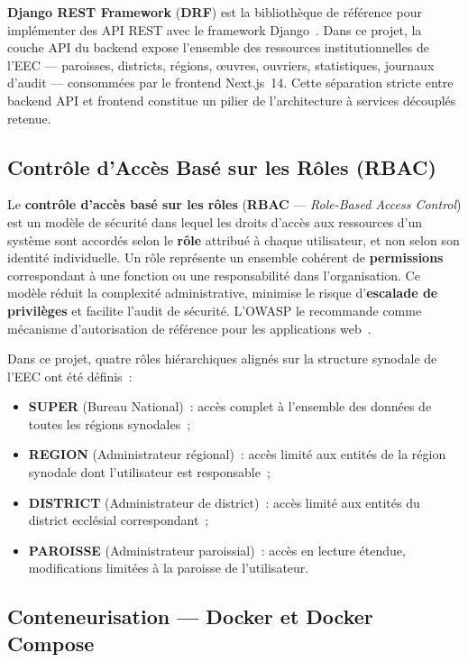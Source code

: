 \documentclass[12pt, a4paper]{report}
\newcommand{\kw}[1]{\textbf{#1}}
\begin{document}
\kw{Django REST Framework} (\kw{DRF}) est la bibliothèque de référence pour
implémenter des API REST avec le framework Django~\cite{drf2024}. Dans ce projet, la couche
API du backend expose l'ensemble des ressources institutionnelles de l'EEC ---
paroisses, districts, régions, œuvres, ouvriers, statistiques, journaux d'audit
--- consommées par le frontend Next.js~14. Cette séparation stricte entre backend
API et frontend constitue un pilier de l'architecture à services découplés retenue.

\subsection{Contrôle d'Accès Basé sur les Rôles (RBAC)}

Le \kw{contrôle d'accès basé sur les rôles} (\kw{RBAC} --- \textit{Role-Based
Access Control}) est un modèle de sécurité dans lequel les droits d'accès aux
ressources d'un système sont accordés selon le \textbf{rôle} attribué à chaque
utilisateur, et non selon son identité individuelle. Un rôle représente un
ensemble cohérent de \textbf{permissions} correspondant à une fonction ou une
responsabilité dans l'organisation. Ce modèle réduit la complexité
administrative, minimise le risque d'\textbf{escalade de privilèges} et facilite
l'audit de sécurité. L'OWASP le recommande comme mécanisme d'autorisation de
référence pour les applications web~\cite{owasp2021}.

Dans ce projet, quatre rôles hiérarchiques alignés sur la structure synodale de
l'EEC ont été définis~:
\begin{itemize}[itemsep=2pt, topsep=4pt, leftmargin=1.5cm]
  \item \textbf{SUPER} (Bureau National)~: accès complet à l'ensemble des données
    de toutes les régions synodales~;
  \item \textbf{REGION} (Administrateur régional)~: accès limité aux entités de
    la région synodale dont l'utilisateur est responsable~;
  \item \textbf{DISTRICT} (Administrateur de district)~: accès limité aux entités
    du district ecclésial correspondant~;
  \item \textbf{PAROISSE} (Administrateur paroissial)~: accès en lecture étendue,
    modifications limitées à la paroisse de l'utilisateur.
\end{itemize}

\subsection{Conteneurisation --- Docker et Docker Compose}
\end{document}

